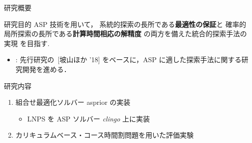 \documentclass[11pt,dvipdfmx]{beamer}
\begin{document}
\begin{frame}{研究概要}
  \begin{alertblock}{研究目的}\centering
    ASP 技術を用いて，
   系統的探索の長所である\alert{\bf 最適性の保証}と
   確率的局所探索の長所である\alert{\bf 計算時間相応の解精度}
   の両方を備えた統合的探索手法の実現
   を目指す.
  \end{alertblock}

  \begin{itemize}
  \item {}:
    先行研究の~[坡山ほか '18]
    をベースに，ASP に適した探索手法に関する研究開発を進める．
  \end{itemize}

  \begin{block}{研究内容}
    \begin{enumerate}
    \item 組合せ最適化ソルバー asprior の実装
     \begin{itemize}
      \item LNPS を ASP ソルバー \textit{clingo} 上に実装
     \end{itemize}
    \item カリキュラムベース・コース時間割問題を用いた評価実験
    \end{enumerate}
  \end{block}
\end{frame}
\end{document}
